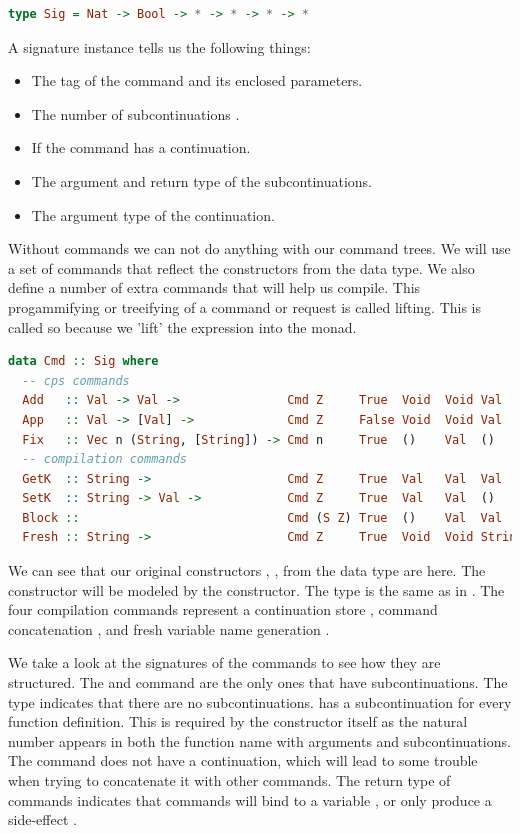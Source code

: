 \begin{lstlisting}[language=Haskell]
type Sig = Nat -> Bool -> * -> * -> * -> *
\end{lstlisting}

A signature instance  tells us the following things:

\begin{itemize}
\item The tag of the command and its enclosed parameters.
\item The number of subcontinuations .
\item If the command has a continuation.
\item The argument  and return type  of the subcontinuations.
\item The argument type  of the continuation.
\end{itemize}

Without commands we can not do anything with our command trees. We will use a set of commands that reflect the constructors from the  data type. We also define a number of extra commands that will help us compile. This progammifying or treeifying of a command or request is called lifting. This is called so because we 'lift' the expression into the monad.

\begin{lstlisting}[language=Haskell]
data Cmd :: Sig where
  -- cps commands
  Add   :: Val -> Val ->               Cmd Z     True  Void  Void Val
  App   :: Val -> [Val] ->             Cmd Z     False Void  Void Val
  Fix   :: Vec n (String, [String]) -> Cmd n     True  ()    Val  ()
  -- compilation commands
  GetK  :: String ->                   Cmd Z     True  Val   Val  Val
  SetK  :: String -> Val ->            Cmd Z     True  Val   Val  ()
  Block ::                             Cmd (S Z) True  ()    Val  Val
  Fresh :: String ->                   Cmd Z     True  Void  Void String
\end{lstlisting}

We can see that our original constructors , ,  from the  data type are here. The  constructor will be modeled by the  constructor. The  type is the same as in . The four compilation commands represent a continuation store , command concatenation , and fresh variable name generation .

We take a look at the signatures of the commands to see how they are structured. The  and  command are the only ones that have subcontinuations. The  type indicates that there are no subcontinuations.  has a subcontinuation for every function definition. This is required by the constructor itself as the natural number  appears in both the function name with arguments and subcontinuations. The  command does not have a continuation, which will lead to some trouble when trying to concatenate it with other commands. The return type of commands indicates that commands will bind to a variable , or only produce a side-effect \icode{()}.


